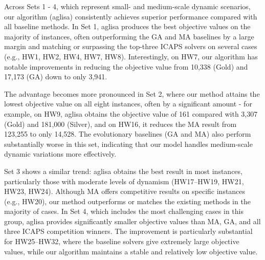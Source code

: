 \documentclass[]{interact}
\begin{document}
Across Sets 1 - 4, which represent small- and medium-scale dynamic scenarios, our algorithm (\gls{aglisa}) consistently achieves superior performance compared with all baseline methods. In Set 1, \gls{aglisa} produces the best objective values on the majority of instances, often outperforming the GA and MA baselines by a large margin and matching or surpassing the top-three ICAPS solvers on several cases (e.g., HW1, HW2, HW4, HW7, HW8). Interestingly, on HW7, our algorithm has notable improvements in reducing the objective value from 10,338 (Gold) and 17,173 (GA) down to only 3,941.

The advantage becomes more pronounced in Set 2, where our method attains the lowest objective value on all eight instances, often by a significant amount  - for example, on HW9, \gls{aglisa} obtains the objective value of 161 compared with 3,307 (Gold) and 181,000 (Silver), and on HW16, it reduces the MA result from 123,255 to only 14,528. The evolutionary baselines (GA and MA) also perform substantially worse in this set, indicating that our model handles medium-scale dynamic variations more effectively.

Set 3 shows a similar trend: \gls{aglisa} obtains the best result in most instances, particularly those with moderate levels of dynamism (HW17–HW19, HW21, HW23, HW24). Although MA offers competitive results on specific instances (e.g., HW20), our method outperforms or matches the existing methods in the majority of cases. In Set 4, which includes the most challenging cases in this group, \gls{aglisa} provides significantly smaller objective values than MA, GA, and all three ICAPS competition winners. The improvement is particularly substantial for HW25–HW32, where the baseline solvers give extremely large objective values, while our algorithm maintains a stable and relatively low objective value.
\end{document}

